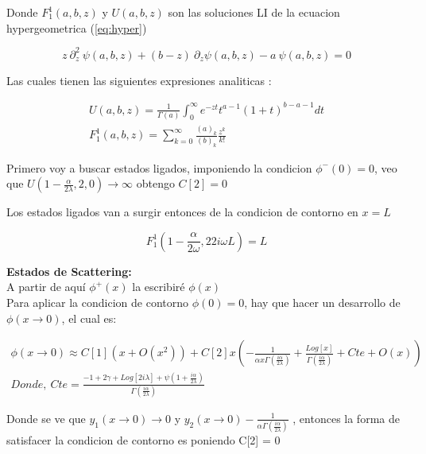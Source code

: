 Donde $F _1 ^1(a,b,z)$ y $ U(a,b,z)$ son las soluciones LI de la ecuacion hypergeometrica (\ref{eq:hyper})

\begin{equation}
    z \ \partial ^2 _z \ \psi (a,b,z) + (b-z) \
    \partial _z \psi (a,b,z)
    -a \ \psi (a,b,z) = 0
\label{eq:hyper}
\end{equation}

Las cuales tienen las siguientes expresiones analiticas  : 

\begin{equation}
\begin{array}{c}
	U(a,b,z) = \frac{1}{\Gamma (a)} 
	\int _0 ^{\infty} e ^{-zt}
	t ^{a-1}
	(1+t) ^{b-a-1}
	dt \\
	F _1 ^1 (a,b,z) = \sum _ {k=0} ^{\infty} 
	\frac{(a) _k}{(b) _k} 
	\frac{z ^k}{k!} 
\end{array}
\end{equation}

Primero voy a buscar estados ligados, imponiendo la condicion $\phi ^{-} (0) = 0$, veo que $U(1- \frac{\alpha}{2 \lambda} ,2 ,0) \rightarrow \infty $ obtengo $C[2] = 0$

Los estados ligados van a surgir entonces de la condicion de contorno en $x=L$

\begin{equation}
	F _1 ^{1} (1- \frac{\alpha}{2 \omega} , 2 2 i \omega L ) = L 
\end{equation}


\textbf{Estados de Scattering:} \\
    A partir de aquí $\phi ^{+} (x)$ la escribiré $\phi (x)$ \\


Para aplicar la condicion de contorno $\phi (0) = 0$, hay que hacer un desarrollo de $\phi(x \rightarrow 0)$, el cual es:

\begin{equation}
\begin{array}{c}
\phi (x \rightarrow 0) \approx
C[1] ( x + O(x ^2)) + 
C[2] x 
\left( - 
\frac{1}{  \alpha x  \Gamma ( \frac{i \alpha}{2 \lambda}  )   }  +
\frac{Log[x] }{\Gamma ( \frac{i \alpha}{2 \lambda} ) } + Cte + O(x)
\right)
\\
Donde,  \ Cte = 
\frac{
-1 + 2 \gamma + Log[2 i \lambda] + \psi (1 + \frac{i \alpha}{2 \lambda})
}
{\Gamma (\frac{i \alpha}{2 \lambda})}
\end{array}
\end{equation}

Donde se ve que $y _1 (x \rightarrow 0 ) \rightarrow 0$ y $y _2 (x \rightarrow 0) - 
\frac{1}{  \alpha   \Gamma ( \frac{i \alpha}{2 \lambda}  )   } $ , entonces la forma de satisfacer la condicion de contorno es poniendo C[2] = 0

